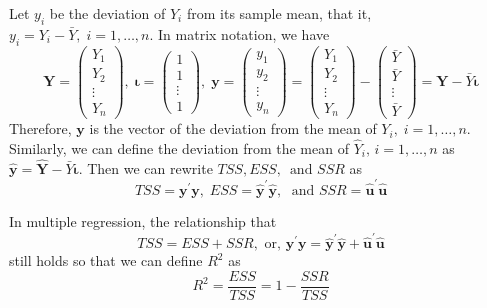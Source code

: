 \documentclass[a4paper,11pt]{article}
\begin{document}
Let \(y_i\) be the deviation of \(Y_i\) from its sample mean, that it,
\(y_i = Y_i - \bar{Y},\; i=1,\ldots,n\). In matrix notation, we have
\begin{equation*}
\mathbf{Y} =
\begin{pmatrix}
Y_1 \\
Y_2 \\
\vdots \\
Y_n
\end{pmatrix},\;
\boldsymbol{\iota} =
\begin{pmatrix}
1 \\
1 \\
\vdots \\
1
\end{pmatrix},\;
\mathbf{y} =
\begin{pmatrix}
y_1 \\
y_2 \\
\vdots \\
y_n
\end{pmatrix}
=
\begin{pmatrix}
Y_1 \\
Y_2 \\
\vdots \\
Y_n
\end{pmatrix}
-
\begin{pmatrix}
\bar{Y} \\
\bar{Y} \\
\vdots \\
\bar{Y}
\end{pmatrix}
=
\mathbf{Y} - \bar{Y} \boldsymbol{\iota}
\end{equation*}
Therefore, \(\mathbf{y}\) is the vector of the deviation from the mean of
\(Y_i,\; i=1,\ldots,n\). Similarly, we can define the deviation from the
mean of \(\hat{Y}_i,\, i=1, \ldots, n\) as \(\hat{\mathbf{y}} =
\hat{\mathbf{Y}} - \bar{Y} \boldsymbol{\iota}\). Then we can rewrite
\(TSS, ESS,\, \text{ and } SSR\) as
\[ TSS = \mathbf{y}^{\prime} \mathbf{y},\; ESS =
\hat{\mathbf{y}}^{\prime} \hat{\mathbf{y}},\; \text{ and } SSR =
\hat{\mathbf{u}}^{\prime} \hat{\mathbf{u}} \]

In multiple regression, the relationship that
\[ TSS = ESS + SSR, \text{ or, } \mathbf{y}^{\prime} \mathbf{y} =
\hat{\mathbf{y}}^{\prime} \hat{\mathbf{y}} + \hat{\mathbf{u}}^{\prime}
\hat{\mathbf{u}}\]
still holds so that we can define \(R^2\) as
\begin{equation}
\label{eq:r2-center}
R^2 = \frac{ESS}{TSS} = 1 - \frac{SSR}{TSS}
\end{equation}
\end{document}

